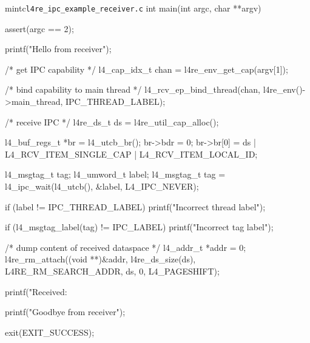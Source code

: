 \begin{mintlisting}[label=lst:l4re_ipc_example_receiver]{mintc}{\texttt{l4re\_ipc\_example\_receiver.c}}
int
main(int argc, char **argv)
{
  assert(argc == 2);

  printf("Hello from receiver\n");

  /* get IPC capability */
  l4_cap_idx_t chan = l4re_env_get_cap(argv[1]);

  /* bind capability to main thread */
  l4_rcv_ep_bind_thread(chan, l4re_env()->main_thread, IPC_THREAD_LABEL);

  /* receive IPC */
  l4re_ds_t ds = l4re_util_cap_alloc();

  l4_buf_regs_t *br = l4_utcb_br();
  br->bdr = 0;
  br->br[0] = ds | L4_RCV_ITEM_SINGLE_CAP | L4_RCV_ITEM_LOCAL_ID;

  l4_msgtag_t tag;
  l4_umword_t label;
  l4_msgtag_t tag = l4_ipc_wait(l4_utcb(), &label, L4_IPC_NEVER);

  if (label != IPC_THREAD_LABEL)
    printf("Incorrect thread label\n");

  if (l4_msgtag_label(tag) != IPC_LABEL)
    printf("Incorrect tag label\n");

  /* dump content of received dataspace */
  l4_addr_t *addr = 0;
  l4re_rm_attach((void **)&addr,
                 l4re_ds_size(ds),
                 L4RE_RM_SEARCH_ADDR,
                 ds,
                 0,
                 L4_PAGESHIFT);

  printf("Received: %

  printf("Goodbye from receiver\n");

  exit(EXIT_SUCCESS);
}
\end{mintlisting}
